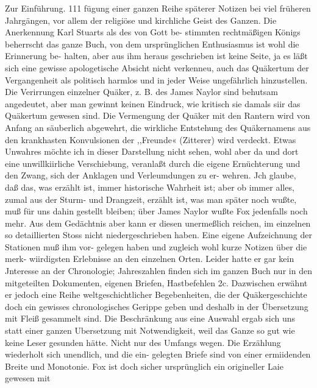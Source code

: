Zur Einführung. 111
fügung einer ganzen Reihe späterer Notizen bei viel früheren
Jahrgängen, vor allem der religiöse und kirchliche Geist des
Ganzen. Die Anerkennung Karl Stuarts als des von Gott be-
stimmten rechtmäßigen Königs beherrscht das ganze Buch, von
dem ursprünglichen Enthusiasmus ist wohl die Erinnerung be-
halten, aber aus ihm heraus geschrieben ist keine Seite, ja es
läßt sich eine gewisse apologetische Absicht nicht verkenneu, auch
das Quäkertum der Vergangenheit als politisch harmlos und in
jeder Weise ungefährlich hinzustellen. Die Verirrungen einzelner
Quäker, z. B. des James Naylor sind behutsam angedeutet, aber
man gewinnt keinen Eindruck, wie kritisch sie damals siir das
Quäkertum gewesen sind. Die Vermengung der Quäker mit den
Rantern wird von Anfang an säuberlich abgewehrt, die wirkliche
Entstehung des Quäkernamens aus den krankhasten Konvulsionen
der ,,Freunde« (Zitterer) wird verdeckt. Etwas Unwahres möchte ich
in dieser Darstellung nicht sehen, wohl aber da und dort eine
unwillkiirliche Verschiebung, veranlaßt durch die eigene Ernüchterung
und den Zwang, sich der Anklagen und Verleumdungen zu er-
wehren. Jch glaube, daß das, was erzählt ist, immer historische
Wahrheit ist; aber ob immer alles, zumal aus der Sturm- und
Drangzeit, erzählt ist, was man später noch wußte, muß für uns
dahin gestellt bleiben; über James Naylor wußte Fox jedenfalls
noch mehr. Aus dem Gedächtnis aber kann er diesen unermeßlich
reichen, im einzelnen so detaillierten Stoss nicht niedergeschrieben
haben. Eine eigene Aufzeichnung der Stationen muß ihm vor-
gelegen haben und zugleich wohl kurze Notizen über die merk-
wiirdigsten Erlebnisse an den einzelnen Orten. Leider hatte er
gar kein Jnteresse an der Chronologie; Jahreszahlen finden sich
im ganzen Buch nur in den mitgeteilten Dokumenten, eigenen
Briefen, Hastbefehlen 2c. Dazwischen erwähnt er jedoch eine
Reihe weltgeschichtlicher Begebenheiten, die der Quäkergeschichte
doch ein gewisses chronologisches Gerippe geben und deshalb in
der Übersetzung mit Fleiß gesammelt sind.
Die Beschränkung aus eine Auswahl ergab sich uns statt
einer ganzen Ubersetzung mit Notwendigkeit, weil das Ganze so
gut wie keine Leser gesunden hätte. Nicht nur des Umfangs
wegen. Die Erzählung wiederholt sich unendlich, und die ein-
gelegten Briefe sind von einer ermiidenden Breite und Monotonie.
Fox ist doch sicher ursprünglich ein origineller Laie gewesen mit




